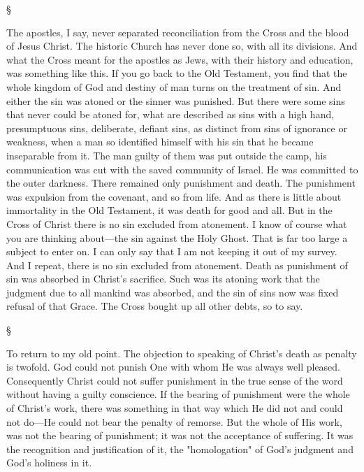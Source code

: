 \documentclass[12pt,letterpaper,oneside]{book}
\begin{document}
\begin{center}
\S
\end{center}


The apostles, I say, never separated reconciliation 
from the Cross and the blood of Jesus 
Christ. The historic Church has never done so, 
with all its divisions. And what the Cross 
meant for the apostles as Jews, with their history 
and education, was something like this. If 
you go back to the Old Testament, you find 
that the whole kingdom of God and destiny of 
man turns on the treatment of sin. And either 
the sin was atoned or the sinner was punished. 
But there were some sins that never could be 
atoned for, what are described as sins with 
a high hand, presumptuous sins, deliberate, 
defiant sins, as distinct from sins of ignorance 
or weakness, when a man so identified himself 
with his sin that he became inseparable from 
it. The man guilty of them was put outside 
the camp, his communication was cut with the 
saved community of Israel. He was committed 
to the outer darkness. There remained only 
punishment and death. The punishment was 
expulsion from the covenant, and so from life. 
And as there is little about immortality in 
the Old Testament, it was death for good and 
all. But in the Cross of Christ there is no 
sin excluded from atonement. I know of 
course what you are thinking about---the sin 
against the Holy Ghost. That is far too large 
a subject to enter on. I can only say that 
I am not keeping it out of my survey. 
And I repeat, there is no sin excluded from 
atonement. Death as punishment of sin was 
absorbed in Christ's sacrifice. Such was its 
atoning work that the judgment due to all 
mankind was absorbed, and the sin of sins 
now was fixed refusal of that Grace. The 
Cross bought up all other debts, so to say. 

\begin{center}
\S
\end{center}

To return to my old point. The objection to 
speaking of Christ's death as penalty is twofold. 
God could not punish One with whom 
He was always well pleased. Consequently 
Christ could not suffer punishment in the true 
sense of the word without having a guilty 
conscience. If the bearing of punishment were 
the whole of Christ's work, there was something 
in that way which He did not and could not do---He 
could not bear the penalty of remorse. But 
the whole of His work, was not the bearing of 
punishment; it was not the acceptance of suffering. 
It was the recognition and justification of 
it, the "homologation" of God's judgment and 
God's holiness in it. 
\end{document}
